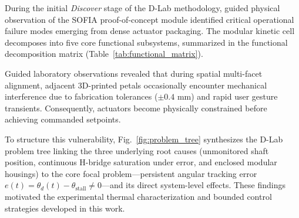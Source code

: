 \documentclass[lettersize,journal]{IEEEtran}
\begin{document}
	During the initial \textit{Discover} stage of the D-Lab methodology, guided physical observation of the SOFIA proof-of-concept module identified critical operational failure modes emerging from dense actuator packaging. The modular kinetic cell decomposes into five core functional subsystems, summarized in the functional decomposition matrix (Table~\ref{tab:functional_matrix}).
	
	Guided laboratory observations revealed that during spatial multi-facet alignment, adjacent 3D-printed petals occasionally encounter mechanical interference due to fabrication tolerances ($\pm 0.4\text{ mm}$) and rapid user gesture transients. Consequently, actuators become physically constrained before achieving commanded setpoints. 
	
	To structure this vulnerability, Fig.~\ref{fig:problem_tree} synthesizes the D-Lab problem tree linking the three underlying root causes (unmonitored shaft position, continuous H-bridge saturation under error, and enclosed modular housings) to the core focal problem—persistent angular tracking error $e(t) = \theta_d(t) - \theta_{\text{stall}} \neq 0$—and its direct system-level effects. These findings motivated the experimental thermal characterization and bounded control strategies developed in this work.
	
\end{document}
